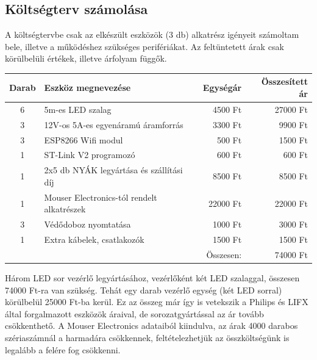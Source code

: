 \documentclass[../main.tex]{subfiles}
\begin{document}
    \subsection{Költségterv számolása}
        A költségtervbe csak az elkészült eszközök (3 db) alkatrész igényeit számoltam bele, illetve a működéshez szükséges perifériákat. Az feltüntetett árak csak körülbelüli értékek, illetve árfolyam függők.
        \begin{table}[h!]
        \centering
            \begin{tabular}{clrr}
            Darab     & Eszköz megnevezése                                      & Egységár  & Összesített ár \\
            \hline
            6         & 5m-es LED szalag                                        & 4500 Ft   & 27000 Ft       \\
            3         & 12V-os 5A-es egyenáramú áramforrás                      & 3300 Ft   & 9900 Ft        \\
            3         & ESP8266 Wifi modul                                      & 500 Ft    & 1500 Ft        \\
            1         & ST-Link V2 programozó                                   & 600 Ft    & 600 Ft         \\
            1         & 2x5 db NYÁK legyártása és szállítási díj                & 8500 Ft   & 8500 Ft        \\
            1         & Mouser Electronics-tól rendelt alkatrészek              & 22000 Ft  & 22000 Ft       \\
            3         & Védődoboz nyomtatása                                    & 1000 Ft   & 3000 Ft        \\
            1         & Extra kábelek, csatlakozók                              & 1500 Ft   & 1500 Ft        \\
            \hline
                      &                                                         & Összesen: & 74000 Ft      
            \end{tabular}
        \end{table}
        
        Három LED sor vezérlő legyártásához, vezérlőként két LED szalaggal, összesen 74000 Ft-ra van szükség. Tehát egy darab vezérlő egység (két LED sorral) körülbelül 25000 Ft-ba kerül. Ez az összeg már így is vetekszik a Philips és LIFX által forgalmazott eszközök áraival, de sorozatgyártással az ár tovább csökkenthető. A Mouser Electronics adataiból kiindulva, az árak 4000 darabos szériaszámnál a harmadára csökkennek, feltételezhetjük az összköltségünk is legalább a felére fog csökkenni.
    
\end{document}
